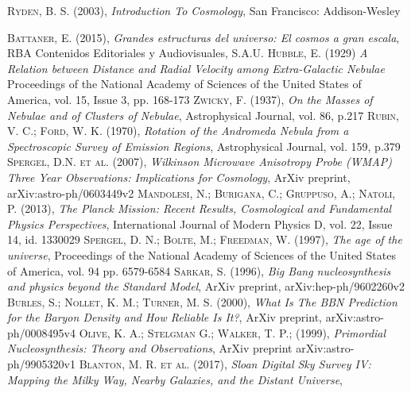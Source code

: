 \documentclass[a4paper,openright,12pt]{book}
\begin{document}
\cleardoublepage
{}
\begin{thebibliography}{a}

 \textsc{Ryden, B. S. (2003)},
\textit{Introduction To Cosmology},
San Francisco: Addison-Wesley

 \textsc{Battaner, E. (2015)},
\textit{Grandes estructuras del universo: El cosmos a gran escala},
RBA Contenidos Editoriales y Audiovisuales, S.A.U.
 \textsc{Hubble, E. (1929)}
\textit{A Relation between Distance and Radial Velocity among Extra-Galactic Nebulae}
Proceedings of the National Academy of Sciences of the United States of America, vol. 15, Issue 3, pp. 168-173
 \textsc{Zwicky, F. (1937)},
\textit{On the Masses of Nebulae and of Clusters of Nebulae},
Astrophysical Journal, vol. 86, p.217
 \textsc{Rubin, V. C.; Ford, W. K. (1970)},
\textit{Rotation of the Andromeda Nebula from a Spectroscopic Survey of Emission Regions},
Astrophysical Journal, vol. 159, p.379 
 \textsc{Spergel, D.N. et al. (2007)},
\textit{Wilkinson Microwave Anisotropy Probe (WMAP) Three Year
Observations: Implications for Cosmology},
ArXiv preprint, arXiv:astro-ph/0603449v2
 \textsc{Mandolesi, N.; Burigana, C.; Gruppuso, A.; Natoli, P. (2013)},
\textit{The Planck Mission: Recent Results, Cosmological and Fundamental Physics Perspectives},
International Journal of Modern Physics D, vol. 22, Issue 14, id. 1330029
 \textsc{Spergel, D. N.; Bolte, M.; Freedman, W. (1997)},
\textit{The age of the universe},
Proceedings of the National Academy of Sciences of the United States of America, vol. 94 pp. 6579-6584
 \textsc{Sarkar, S. (1996)},
\textit{Big Bang nucleosynthesis and physics beyond the Standard Model},
ArXiv preprint, arXiv:hep-ph/9602260v2
 \textsc{Burles, S.; Nollet, K. M.; Turner, M. S. (2000)},
\textit{What Is The BBN Prediction for the Baryon Density and How Reliable Is It?},
ArXiv preprint, arXiv:astro-ph/0008495v4
 \textsc{Olive, K. A.; Stelgman G.; Walker, T. P.; (1999)},
\textit{Primordial Nucleosynthesis: Theory and Observations},
ArXiv preprint arXiv:astro-ph/9905320v1 
 \textsc{Blanton, M. R. et al. (2017)},
\textit{Sloan Digital Sky Survey IV: Mapping the Milky Way, Nearby Galaxies, and the Distant Universe},

\end{thebibliography}
\end{document}
